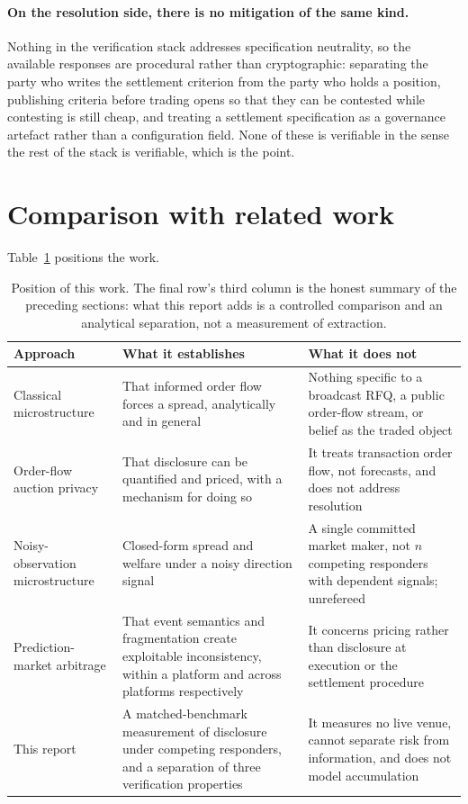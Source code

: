 \paragraph{On the resolution side, there is no mitigation of the same kind.} Nothing in the
verification stack addresses specification neutrality, so the available responses are
procedural rather than cryptographic: separating the party who writes the settlement
criterion from the party who holds a position, publishing criteria before trading opens so
that they can be contested while contesting is still cheap, and treating a settlement
specification as a governance artefact rather than a configuration field. None of these is
verifiable in the sense the rest of the stack is verifiable, which is the point.

\section{Comparison with related work}
\label{sec:related}

Table~\ref{tab:related} positions the work.

\begin{table}[htbp]
\centering
\small
\begin{tabularx}{\textwidth}{p{}p{}X}
\toprule
\textbf{Approach} & \textbf{What it establishes} & \textbf{What it does not} \\
\midrule
Classical microstructure \cite{glosten1985bidask,kyle1985continuous} & That informed order flow forces a spread, analytically and in general & Nothing specific to a broadcast RFQ, a public order-flow stream, or belief as the traded object \\
Order-flow auction privacy \cite{passeratpalmbach2025dphints} & That disclosure can be quantified and priced, with a mechanism for doing so & It treats transaction order flow, not forecasts, and does not address resolution \\
Noisy-observation microstructure \cite{nakamura2026privacysubsidy,nakamura2026kyle} & Closed-form spread and welfare under a noisy direction signal & A single committed market maker, not $n$ competing responders with dependent signals; unrefereed \\
Prediction-market arbitrage \cite{saguillo2025forest,gebele2026semantic} & That event semantics and fragmentation create exploitable inconsistency, within a platform and across platforms respectively & It concerns pricing rather than disclosure at execution or the settlement procedure \\
This report & A matched-benchmark measurement of disclosure under competing responders, and a separation of three verification properties & It measures no live venue, cannot separate risk from information, and does not model accumulation \\
\bottomrule
\end{tabularx}
\caption{Position of this work. The final row's third column is the honest summary of the
preceding sections: what this report adds is a controlled comparison and an analytical
separation, not a measurement of extraction.}
\label{tab:related}
\end{table}

